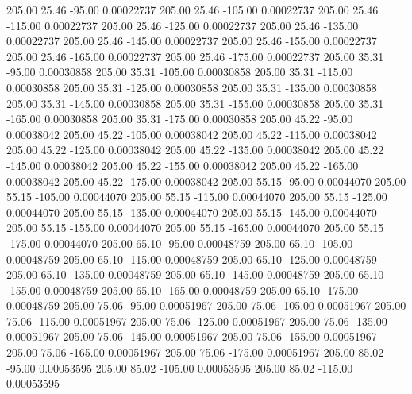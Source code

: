     205.00     25.46    -95.00     0.00022737
    205.00     25.46   -105.00     0.00022737
    205.00     25.46   -115.00     0.00022737
    205.00     25.46   -125.00     0.00022737
    205.00     25.46   -135.00     0.00022737
    205.00     25.46   -145.00     0.00022737
    205.00     25.46   -155.00     0.00022737
    205.00     25.46   -165.00     0.00022737
    205.00     25.46   -175.00     0.00022737
    205.00     35.31    -95.00     0.00030858
    205.00     35.31   -105.00     0.00030858
    205.00     35.31   -115.00     0.00030858
    205.00     35.31   -125.00     0.00030858
    205.00     35.31   -135.00     0.00030858
    205.00     35.31   -145.00     0.00030858
    205.00     35.31   -155.00     0.00030858
    205.00     35.31   -165.00     0.00030858
    205.00     35.31   -175.00     0.00030858
    205.00     45.22    -95.00     0.00038042
    205.00     45.22   -105.00     0.00038042
    205.00     45.22   -115.00     0.00038042
    205.00     45.22   -125.00     0.00038042
    205.00     45.22   -135.00     0.00038042
    205.00     45.22   -145.00     0.00038042
    205.00     45.22   -155.00     0.00038042
    205.00     45.22   -165.00     0.00038042
    205.00     45.22   -175.00     0.00038042
    205.00     55.15    -95.00     0.00044070
    205.00     55.15   -105.00     0.00044070
    205.00     55.15   -115.00     0.00044070
    205.00     55.15   -125.00     0.00044070
    205.00     55.15   -135.00     0.00044070
    205.00     55.15   -145.00     0.00044070
    205.00     55.15   -155.00     0.00044070
    205.00     55.15   -165.00     0.00044070
    205.00     55.15   -175.00     0.00044070
    205.00     65.10    -95.00     0.00048759
    205.00     65.10   -105.00     0.00048759
    205.00     65.10   -115.00     0.00048759
    205.00     65.10   -125.00     0.00048759
    205.00     65.10   -135.00     0.00048759
    205.00     65.10   -145.00     0.00048759
    205.00     65.10   -155.00     0.00048759
    205.00     65.10   -165.00     0.00048759
    205.00     65.10   -175.00     0.00048759
    205.00     75.06    -95.00     0.00051967
    205.00     75.06   -105.00     0.00051967
    205.00     75.06   -115.00     0.00051967
    205.00     75.06   -125.00     0.00051967
    205.00     75.06   -135.00     0.00051967
    205.00     75.06   -145.00     0.00051967
    205.00     75.06   -155.00     0.00051967
    205.00     75.06   -165.00     0.00051967
    205.00     75.06   -175.00     0.00051967
    205.00     85.02    -95.00     0.00053595
    205.00     85.02   -105.00     0.00053595
    205.00     85.02   -115.00     0.00053595
